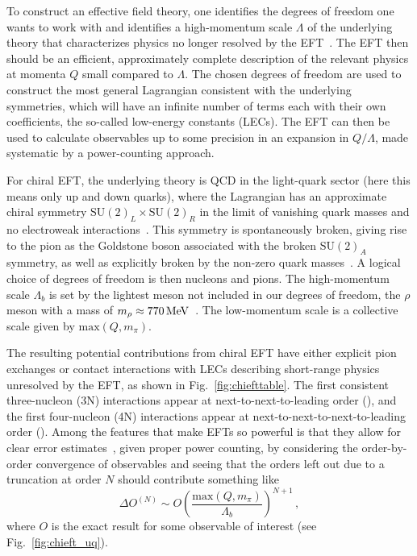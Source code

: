 To construct an effective field theory, one identifies the degrees of freedom one wants to work with
and identifies a high-momentum scale $\Lambda$ of the underlying theory that characterizes physics no longer resolved by the EFT~\cite{Hamm19nuceftreview}.
The EFT then should be an efficient, approximately complete description of the relevant physics
at momenta $Q$ small compared to $\Lambda$.
The chosen degrees of freedom are used to construct the most general Lagrangian consistent with the underlying symmetries,
which will have an infinite number of terms each with their own coefficients,
the so-called low-energy constants (LECs).
The EFT can then be used to calculate observables up to some precision in an expansion in $Q/\Lambda$,
made systematic by a power-counting approach.

For chiral EFT,
the underlying theory is QCD in the light-quark sector
(here this means only up and down quarks),
where the Lagrangian has an approximate chiral symmetry $\text{SU}{(2)}_L \times \text{SU}{(2)}_R$
in the limit of vanishing quark masses and no electroweak interactions~\cite{Hamm19nuceftreview}.
This symmetry is spontaneously broken,
giving rise to the pion as the Goldstone boson associated with the broken $\text{SU}{(2)}_A$ symmetry,
as well as explicitly broken by the non-zero quark masses~\cite{Page74chisymm}.
A logical choice of degrees of freedom is then nucleons and pions.
The high-momentum scale $\Lambda_b$ is set by the lightest meson not included in our degrees of freedom,
the $\rho$ meson with a mass of $m_{\rho}\approx 770 \, \text{MeV}$~\cite{Mach11chiraleft}.
The low-momentum scale is a collective scale given by $\text{max}(Q, m_{\pi})$.

The resulting potential contributions from chiral EFT have either explicit pion exchanges
or contact interactions with LECs describing short-range physics unresolved by the EFT,
as shown in Fig.~\ref{fig:chiefttable}.
The first consistent three-nucleon (3N) interactions appear at next-to-next-to-leading order (\ntwolo{}),
and the first four-nucleon (4N) interactions appear at next-to-next-to-next-to-leading order (\nthreelo{}).
Among the features that make EFTs so powerful is that they allow for clear error estimates~\cite{Furn15bayesuq,Epel14ekm1,Epel14ekm2},
given proper power counting,
by considering the order-by-order convergence of observables
and seeing that the orders left out due to a truncation at order $N$ should contribute something like
\begin{equation}
  \Delta O^{(N)} \sim O {\left(\frac{\text{max}(Q, m_{\pi})}{\Lambda_b} \right)}^{N+1}\,,
\end{equation}
where $O$ is the exact result for some observable of interest
(see Fig.~\ref{fig:chieft_uq}).

